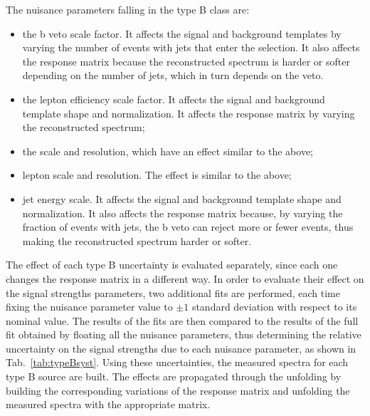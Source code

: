 The nuisance parameters falling in the type B class are:
\begin{itemize}
\item the b veto scale factor. It affects the signal and background templates
by varying the number of events with jets that enter the selection. It also
affects the response matrix because the reconstructed spectrum is harder or softer depending on the number of jets, which in turn depends on the veto. 
\item the lepton efficiency scale factor. It affects the signal and background
template shape and normalization. It affects the response matrix by varying
the reconstructed spectrum;
\item the \MET scale and resolution, which have an effect similar to the above;
\item lepton scale and resolution. The effect is similar to the above;
\item jet energy scale. It affects the signal and background template shape
and normalization. It also affects the response matrix because, by varying the
fraction of events with jets, the b veto can reject more or fewer events, thus
making the reconstructed spectrum harder or softer.
\end{itemize}
The effect of each type B uncertainty is evaluated separately,
since each one changes the response matrix in a different way.
In order to evaluate their effect on the signal strengths parameters, two additional fits are
performed, each time fixing  the nuisance parameter value to $\pm 1$  standard
deviation with respect
to its nominal value. The results of the fits are then compared to the results of the full fit obtained by floating  all the nuisance parameters, thus 
determining the relative uncertainty on the signal strengths due to each
nuisance parameter, as shown in Tab.~\ref{tab:typeBsyst}.
Using these uncertainties, the measured spectra for each type B
source are built.
The effects are propagated through the unfolding by building the corresponding variations of the response matrix and unfolding the
measured spectra with the appropriate matrix.

